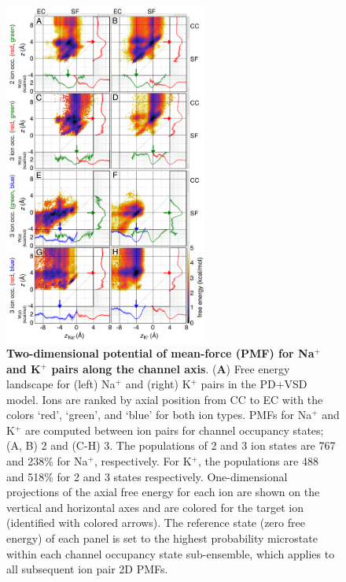 \begin{refsection}
\begin{figure}[hp]
\centering
\includegraphics[width=0.6\textwidth]{nav2/Nav2Fig3}
\caption[Two-dimensional potential of mean-force (PMF) for Na$^+$ and K$^+$ pairs along the channel axis]{\textbf{Two-dimensional potential of mean-force (PMF) for Na$^+$ and K$^+$ pairs along the channel axis}. (\textbf{A}) Free energy landscape for (left) Na$^+$ and (right) K$^+$ pairs in the PD+VSD model. Ions are ranked by axial position from CC to EC with the colors `red', `green', and `blue' for both ion types. PMFs for Na$^+$ and K$^+$ are computed between ion pairs for channel occupancy states; (A, B) 2 and (C-H) 3. The populations of 2 and 3 ion states are 767 and 238\% for Na$^+$, respectively. For K$^+$, the populations are 488 and 518\% for 2 and 3 states respectively. One-dimensional projections of the axial free energy for each ion are shown on the vertical and horizontal axes and are colored for the target ion (identified with colored arrows). The reference state (zero free energy) of each panel is set to the highest probability microstate within each channel occupancy state sub-ensemble, which applies to all subsequent ion pair 2D PMFs.}
\label{fig:nav2fig3}
\end{figure}


\end{refsection}
